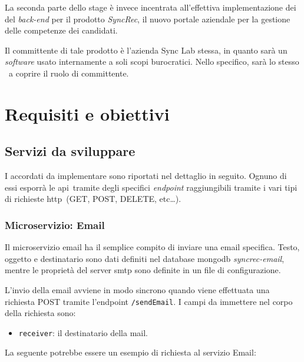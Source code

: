 La seconda parte dello stage è invece incentrata all'effettiva implementazione dei  del \textit{back-end} per il prodotto \textit{SyncRec}, il nuovo portale aziendale per la gestione delle competenze dei candidati.

Il committente di tale prodotto è l'azienda Sync Lab stessa, in quanto sarà un \textit{software} usato internamente a soli scopi burocratici.
Nello specifico, sarà lo stesso \fabio\ a coprire il ruolo di committente.

\section{Requisiti e obiettivi}

\subsection{Servizi  da sviluppare}

I  accordati da implementare sono riportati nel dettaglio in seguito. Ognuno di essi esporrà le \gls{api}\gloss\ tramite degli specifici \textit{endpoint}
raggiungibili tramite i vari tipi di richieste \acrshort{http}\gloss\ (GET, POST, DELETE, etc\dots).


\subsubsection{Microservizio: Email}

Il \gls{microservizio} email ha il semplice compito di inviare una email specifica.
Testo, oggetto e destinatario sono dati definiti nel database \gls{mongodb}
\textit{syncrec-email}, mentre le proprietà del server \acrshort{smtp} sono definite in un file di configurazione.

L'invio della email avviene in modo sincrono quando viene effettuata una richiesta POST tramite l'endpoint \texttt{/sendEmail}.
I campi da immettere nel corpo della richiesta sono:
\begin{itemize}
	\item \texttt{receiver}: il destinatario della mail.
\end{itemize}

La seguente potrebbe essere un esempio di richiesta al servizio Email:

